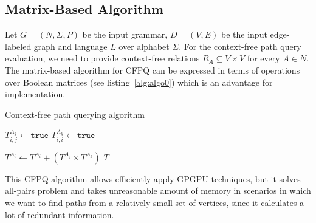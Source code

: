 \subsection{Matrix-Based Algorithm}
Let $G = (N, \Sigma, P)$ be the input grammar, $D = (V, E)$ be the input edge-labeled graph and language $L$ over alphabet $\Sigma$. For the context-free path query evaluation, we need to provide context-free relations \mbox{$R_A \subseteq V \times V$} for every \mbox{$A \in N$}.
The matrix-based algorithm for CFPQ can be expressed in terms of operations over Boolean matrices (see listing~\ref{alg:algo0}) which is an advantage for implementation.
{\footnotesize
\begin{algorithm}
\begin{algorithmic}[1]
\caption{Context-free path querying algorithm}
\label{alg:algo0}
          {$T^{A_k}_{i,j} \gets \texttt{true}$}
    \EndFor
            {$T^{A_k}_{i,i} \gets \texttt{true}$}
        \EndFor
    \EndFor

          { $T^{A_i} \gets T^{A_i} + (T^{A_j} \times T^{A_k})$ } 
        \EndFor
    \EndWhile
\State \Return $T$
\EndFunction
\end{algorithmic}
\end{algorithm}
}

This CFPQ algorithm allows efficiently apply GPGPU techniques, but it solves all-pairs problem and takes unreasonable amount of memory in scenarios in which we want to find paths from a relatively small set of vertices, since it calculates a lot of redundant information.  